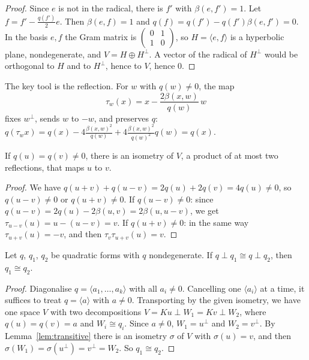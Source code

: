 \begin{proof}
Since $e$ is not in the radical, there is $f'$ with $\beta(e,f')=1$. Let $f=f'-\frac{q(f')}2e$. Then $\beta(e,f)=1$ and
$q(f)=q(f')-q(f')\beta(e,f')=0$. In the basis $e,f$ the Gram matrix is $\begin{pmatrix}0&1\\1&0\end{pmatrix}$, so $H=\langle e,f\rangle$ is a hyperbolic plane,
nondegenerate, and $V=H\oplus H^\perp$. A vector of the radical of $H^\perp$ would be orthogonal to $H$ and to $H^\perp$, hence to $V$, hence $0$.
\end{proof}

The key tool is the reflection. For $w$ with $q(w)\ne0$, the map
\[
\tau_w(x)=x-\frac{2\beta(x,w)}{q(w)}\,w
\]
fixes $w^\perp$, sends $w$ to $-w$, and preserves $q$: $q(\tau_wx)=q(x)-4\frac{\beta(x,w)^2}{q(w)}+4\frac{\beta(x,w)^2}{q(w)^2}q(w)=q(x)$.

\begin{lemma}\label{lem:transitive}
If $q(u)=q(v)\ne0$, there is an isometry of $V$, a product of at most two reflections, that maps $u$ to $v$.
\end{lemma}

\begin{proof}
We have $q(u+v)+q(u-v)=2q(u)+2q(v)=4q(u)\ne0$, so $q(u-v)\ne0$ or $q(u+v)\ne0$. If $q(u-v)\ne0$: since $q(u-v)=2q(u)-2\beta(u,v)=2\beta(u,u-v)$, we get
$\tau_{u-v}(u)=u-(u-v)=v$. If $q(u+v)\ne0$: in the same way $\tau_{u+v}(u)=-v$, and then $\tau_v\tau_{u+v}(u)=v$.
\end{proof}

\begin{theorem}\label{thm:witt}
Let $q$, $q_1$, $q_2$ be quadratic forms with $q$ nondegenerate. If $q\perp q_1\cong q\perp q_2$, then $q_1\cong q_2$.
\end{theorem}

\begin{proof}
Diagonalise $q=\langle a_1,\dots,a_k\rangle$ with all $a_i\ne0$. Cancelling one $\langle a_i\rangle$ at a time, it suffices to treat $q=\langle a\rangle$
with $a\ne0$. Transporting by the given isometry, we have one space $V$ with two decompositions $V=Ku\perp W_1=Kv\perp W_2$, where $q(u)=q(v)=a$ and
$W_i\cong q_i$. Since $a\ne0$, $W_1=u^\perp$ and $W_2=v^\perp$. By Lemma~\ref{lem:transitive} there is an isometry $\sigma$ of $V$ with $\sigma(u)=v$, and
then $\sigma(W_1)=\sigma(u^\perp)=v^\perp=W_2$. So $q_1\cong q_2$.
\end{proof}

